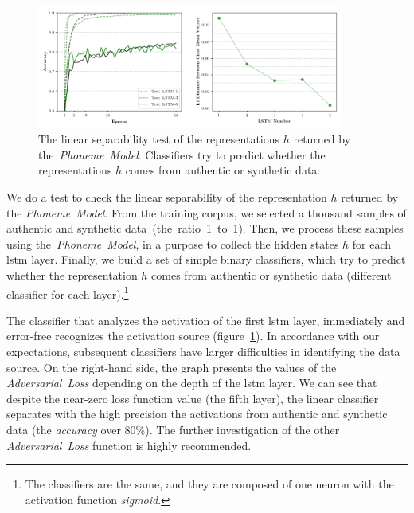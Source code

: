 \begin{figure}[h]
    \centering
    \includegraphics[width=0.9\textwidth]{figures/experiments-representation-disambiguation.png}
    \caption{
The linear separability test of the representations $h$ returned by the~\textit{Phoneme~Model}.
Classifiers try to predict whether the representations $h$ comes from authentic or synthetic data.
}
    \label{fig:representation-disambiguation}
\end{figure}

We do a test to check the linear separability of the representation $h$ returned by the \textit{Phoneme~Model}.
From the training corpus, we selected a thousand samples of authentic and synthetic data~(the~ratio~1~to~1).
Then, we process these samples using the~\textit{Phoneme~Model}, in a purpose to
collect the hidden states $h$ for each \acrshort{lstm} layer.
Finally, we build a set of simple binary classifiers, which try to predict whether the representation  $h$
comes from authentic or synthetic data (different classifier for each layer).\footnote{
The classifiers are the same, and they are composed of one neuron with the activation function \textit{sigmoid}.
}

The classifier that analyzes the activation of the first \acrshort{lstm} layer, immediately
and error-free recognizes the activation source (figure~\ref{fig:representation-disambiguation}).
In accordance with our expectations, subsequent classifiers have larger
difficulties in identifying the data source.
On the right-hand side, the graph presents the values of the \textit{Adversarial~Loss}
depending on the depth of the \acrshort{lstm} layer.
We can see that despite the near-zero loss function value (the fifth layer), the linear classifier
separates with the high precision the activations from authentic and synthetic
data (the \textit{accuracy} over 80\%).
The further investigation of the other \textit{Adversarial~Loss} function is highly recommended.
